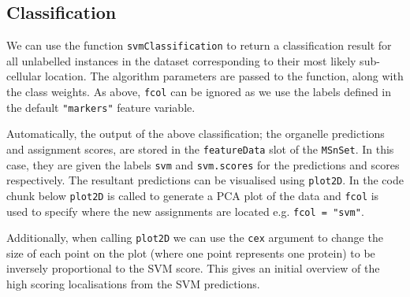 \subsection{Classification}\label{classification}

We can use the function \texttt{svmClassification} to return a
classification result for all unlabelled instances in the dataset
corresponding to their most likely sub-cellular location. The algorithm
parameters are passed to the function, along with the class weights. As
above, \texttt{fcol} can be ignored as we use the labels defined in the
default \texttt{"markers"} feature variable.

\begin{Shaded}
\begin{Highlighting}[]
\StringTok{ }
                         
                         \NormalTok{)}
\end{Highlighting}
\end{Shaded}

Automatically, the output of the above classification; the organelle
predictions and assignment scores, are stored in the
\texttt{featureData} slot of the \texttt{MSnSet}. In this case, they are
given the labels \texttt{svm} and \texttt{svm.scores} for the
predictions and scores respectively. The resultant predictions can be
visualised using \texttt{plot2D}. In the code chunk below
\texttt{plot2D} is called to generate a PCA plot of the data and
\texttt{fcol} is used to specify where the new assignments are located
e.g. \texttt{fcol =  "svm"}.

Additionally, when calling \texttt{plot2D} we can use the \texttt{cex}
argument to change the size of each point on the plot (where one point
represents one protein) to be inversely proportional to the SVM score.
This gives an initial overview of the high scoring localisations from
the SVM predictions.

\begin{Shaded}
\begin{Highlighting}[]
\StringTok{ }\NormalTok{(}\StringTok{ }

 \NormalTok{, } 
 \NormalTok{, } \NormalTok{, } \NormalTok{, } \NormalTok{)}
\end{Highlighting}
\end{Shaded}


